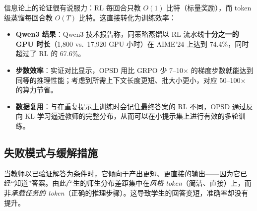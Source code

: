 信息论上的论证很有说服力：RL 每回合只教 $O(1)$ 比特（标量奖励），而 token 级蒸馏每回合教 $O(T)$ 比特。这直接转化为训练效率：
\begin{itemize}
  \item \textbf{Qwen3 结果}：Qwen3 技术报告称，同策略蒸馏以 RL 流水线\textbf{十分之一的 GPU 时长}（1,800 vs.\ 17,920 GPU 小时）在 AIME'24 上达到 74.4\%，同时超过了 RL 的 67.6\%。
  \item \textbf{步数效率}：实证对比显示，OPSD 用比 GRPO 少 7--10$\times$ 的梯度步数就能达到同等的推理性能；考虑到所需上下文长度更短、批大小更小，对应 50--100$\times$ 的算力节省。
  \item \textbf{数据复用}：与在重复提示上训练时会记住最终答案的 RL 不同，OPSD 通过反向 KL 学习逼近教师的完整分布，从而可以在小提示集上进行有效的多轮训练。
\end{itemize}

\subsection{失败模式与缓解措施}
\label{subsec:opsd-failures}

\begin{warningbox}[特权导致的风格漂移]
当教师以已验证解答为条件时，它倾向于产出更短、更直接的输出——因为它已经“知道”答案。由此产生的师生分布差距集中在\emph{风格 token}（简洁、直接）上，而非\emph{承载任务的 token}（正确的推理步骤）。这导致学生的回答变短，准确率却没有提升。
\end{warningbox}

